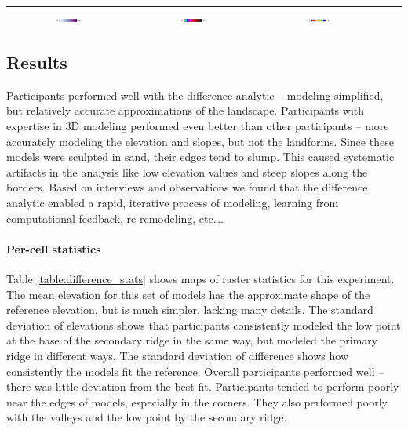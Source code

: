 \documentclass[prodmode,acmtochi]{acmsmall} %
\begin{document}
\begin{table}
{\begin{tabular}{m{} m{} m{} m{} m{}}
\multicolumn{1}{c}{\includegraphics[width=0.22\textwidth]{images/legends/stdev_diff_legend.pdf}} &
\multicolumn{1}{c}{\includegraphics[width=0.22\textwidth]{images/legends/slope_legend.pdf}} &
\multicolumn{1}{c}{\includegraphics[width=0.22\textwidth]{images/legends/forms_legend.pdf}}\\
%
\bottomrule
\end{tabular}}
\label{table:difference_comparison} 
\end{table}

\subsection{Results}
Participants performed well with the difference analytic 
-- modeling simplified, but relatively accurate approximations of the landscape.
Participants with expertise in 3D modeling 
performed even better than other participants 
-- more accurately modeling the elevation and slopes, 
but not the landforms. 
Since these models were sculpted in sand,
their edges tend to slump.
This caused systematic artifacts in the analysis like
low elevation values and steep slopes
along the borders. 
Based on interviews and observations
we found that the difference analytic enabled
a rapid, iterative process 
of modeling, learning from computational feedback, 
re-remodeling, etc\ldots.

\paragraph{Per-cell statistics}
Table \ref{table:difference_stats} shows maps of raster statistics for this experiment.
The mean elevation for this set of models
has the approximate shape of the reference elevation, 
but is much simpler, lacking many details. 
The standard deviation of elevations shows that participants 
consistently modeled the low point at the base of the secondary ridge
in the same way, 
but modeled the primary ridge in different ways. 
The standard deviation of difference shows 
how consistently the models fit the reference. 
Overall participants performed well -- 
there was little deviation from the best fit. 
Participants tended to perform poorly 
near the edges of models, especially in the corners.
They also performed poorly with the valleys 
and the low point by the secondary ridge.
\end{document}
